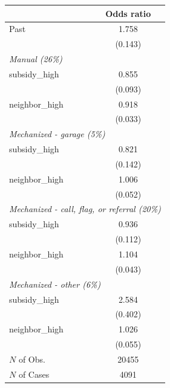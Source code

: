 \begin{tabular}{lc}
\hline\hline
 & Odds ratio \\
\hline
Past & 1.758 \\
 & (0.143) \\
\multicolumn{2}{l}{\textit{Manual (26\%)}} \\
subsidy_high & 0.855 \\
 & (0.093) \\
neighbor_high & 0.918 \\
 & (0.033) \\
\multicolumn{2}{l}{\textit{Mechanized - garage (5\%)}} \\
subsidy_high & 0.821 \\
 & (0.142) \\
neighbor_high & 1.006 \\
 & (0.052) \\
\multicolumn{2}{l}{\textit{Mechanized - call, flag, or referral (20\%)}} \\
subsidy_high & 0.936 \\
 & (0.112) \\
neighbor_high & 1.104 \\
 & (0.043) \\
\multicolumn{2}{l}{\textit{Mechanized - other (6\%)}} \\
subsidy_high & 2.584 \\
 & (0.402) \\
neighbor_high & 1.026 \\
 & (0.055) \\
\hline
$N$ of Obs. & 20455 \\
$N$ of Cases & 4091 \\
\hline\hline
\end{tabular}
